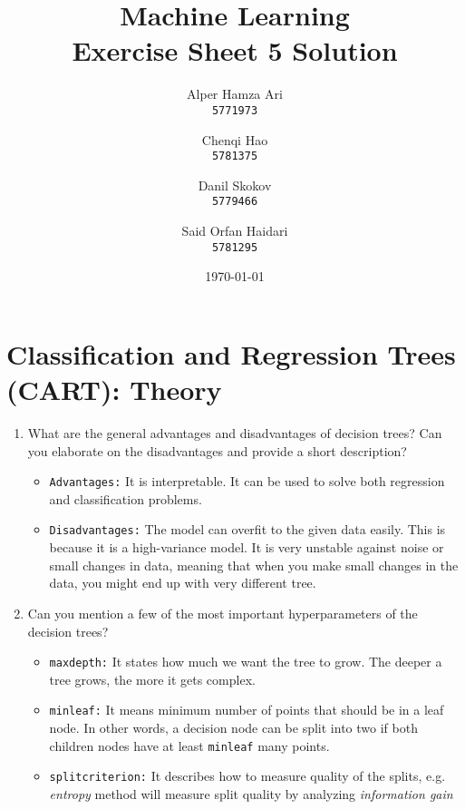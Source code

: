 \documentclass{article}
\title{
Machine Learning \\
[0.2em]Exercise Sheet 5 Solution
}
\author{
  Alper Hamza Ari\\
  \texttt{5771973}
  \and
  Chenqi Hao\\
  \texttt{5781375}
  \and
  Danil Skokov\\
  \texttt{5779466}
  \and
  Said Orfan Haidari\\
  \texttt{5781295}
}
\date{\today}
\begin{document}
\raggedright
\maketitle

\section{Classification and Regression Trees (CART): Theory}
\begin{enumerate}
    \item{What are the general advantages and disadvantages of decision trees? Can you elaborate on the disadvantages and provide a short description?}\\
    \begin{itemize}
        \item \texttt{Advantages:} It is interpretable. It can be used to solve both regression and classification problems.\\
        
        \item \texttt{Disadvantages:} The model can overfit to the given data easily. This is because it is a high-variance model. It is very unstable against noise or small changes in data, meaning that when you make small changes in the data, you might end up with very different tree.
    \end{itemize}
    
    \item{Can you mention a few of the most important hyperparameters of the decision trees?} \\
    \begin{itemize}
        \item \texttt{max\textunderscore depth:} It states how much we want the tree to grow. The deeper a tree grows, the more it gets complex. \\

        \item \texttt{min\textunderscore leaf:} It means minimum number of points that should be in a leaf node. In other words, a decision node can be split into two if both children nodes have at least \texttt{min\textunderscore leaf} many points. \\
        
        \item \texttt{split\textunderscore criterion:} It describes how to measure quality of the splits, e.g. \textit{entropy} method  will measure split quality by analyzing \textit{information gain} \\
    \end{itemize}


\end{enumerate}
\end{document}
